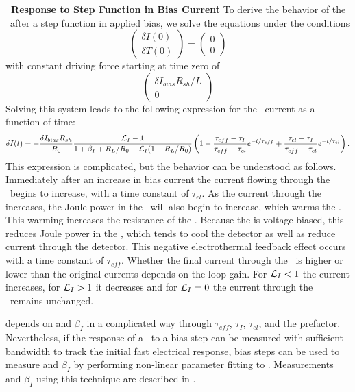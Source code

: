 \textbf{\TES\ Response to Step Function in Bias Current}
To derive the behavior of the \TES\ after a step function in applied bias, we solve the equations under the conditions
\begin{equation}
\begin{pmatrix} \delta I(0) \\ \delta T(0) \end{pmatrix} = \begin{pmatrix} 0 \\ 0 \end{pmatrix}
\end{equation}
with constant driving force starting at time zero of
\begin{equation}
\begin{pmatrix} \delta I_{bias} R_{sh} / L \\ 0 \end{pmatrix}
\end{equation}
Solving this system leads to the following expression for the \TES\ current as a function of time:
\begin{equation}\label{eqn:bias-step-resp}
\delta I (t)
   = - \frac{\delta I_{bias} R_{sh}}{R_0} 
       \frac{\mathcal{L}_I - 1}{1 + \beta_I + R_L/R_0 + \mathcal{L}_I(1 - R_L/R_0)}
       \left(1 - \frac{\tau_{eff} - \tau_I}{\tau_{eff} - \tau_{el}} e^{-t/\tau_{eff}}
    	       + \frac{\tau_{el} - \tau_I}{\tau_{eff} - \tau_{el}} e^{-t/\tau_{el}} \right).
\end{equation}
This expression is complicated, but the behavior can be understood as follows.
Immediately after an increase in bias current the current flowing through the \TES\ begins to increase, with a time constant of $\tau_{el}$.
As the current through the \TES increases, the Joule power in the \TES\ will also begin to increase, which warms the \TES.
This warming increases the resistance of the \TES.
Because the \TES is voltage-biased, this reduces Joule power in the \TES, which tends to cool the detector as well as reduce current through the detector.
This negative electrothermal feedback effect occurs with a time constant of $\tau_{eff}$.
Whether the final current through the \TES\ is higher or lower than the original currents depends on the loop gain.
For $\mathcal{L}_I < 1$ the current increases, for $\mathcal{L}_I > 1$ it decreases and for $\mathcal{L}_I = 0$ the current through the \TES\ remains unchanged.

 depends on \Loop and $\beta_I$ in a complicated way through $\tau_{eff}$, $\tau_I$, $\tau_{el}$, and the prefactor.
Nevertheless, if the response of a \TES\ to a bias step can be measured with sufficient bandwidth to track the initial fast electrical response, bias steps can be used to measure \Loop and $\beta_I$ by performing non-linear parameter fitting to .
Measurements \Loop and $\beta_I$ using this technique are described in .

